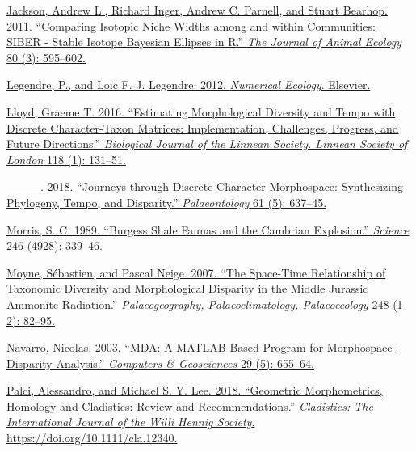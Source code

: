 \href{http://paperpile.com/b/sTGYvp/PwyQ}{Jackson, Andrew L., Richard
Inger, Andrew C. Parnell, and Stuart Bearhop. 2011. ``Comparing Isotopic
Niche Widths among and within Communities: SIBER - Stable Isotope
Bayesian Ellipses in R.''
}\href{http://paperpile.com/b/sTGYvp/PwyQ}{\emph{The Journal of Animal
Ecology}}\href{http://paperpile.com/b/sTGYvp/PwyQ}{ 80 (3): 595--602.}

\href{http://paperpile.com/b/sTGYvp/oFiP}{Legendre, P., and Loic F. J.
Legendre. 2012.
}\href{http://paperpile.com/b/sTGYvp/oFiP}{\emph{Numerical
Ecology}}\href{http://paperpile.com/b/sTGYvp/oFiP}{. Elsevier.}

\href{http://paperpile.com/b/sTGYvp/bCsU}{Lloyd, Graeme T. 2016.
``Estimating Morphological Diversity and Tempo with Discrete
Character-Taxon Matrices: Implementation, Challenges, Progress, and
Future Directions.''
}\href{http://paperpile.com/b/sTGYvp/bCsU}{\emph{Biological Journal of
the Linnean Society. Linnean Society of
London}}\href{http://paperpile.com/b/sTGYvp/bCsU}{ 118 (1): 131--51.}

\href{http://paperpile.com/b/sTGYvp/53SJ}{---------. 2018. ``Journeys
through Discrete-Character Morphospace: Synthesizing Phylogeny, Tempo,
and Disparity.''
}\href{http://paperpile.com/b/sTGYvp/53SJ}{\emph{Palaeontology}}\href{http://paperpile.com/b/sTGYvp/53SJ}{
61 (5): 637--45.}

\href{http://paperpile.com/b/sTGYvp/TtGs}{Morris, S. C. 1989. ``Burgess
Shale Faunas and the Cambrian Explosion.''
}\href{http://paperpile.com/b/sTGYvp/TtGs}{\emph{Science}}\href{http://paperpile.com/b/sTGYvp/TtGs}{
246 (4928): 339--46.}

\href{http://paperpile.com/b/sTGYvp/aVVj}{Moyne, Sébastien, and Pascal
Neige. 2007. ``The Space-Time Relationship of Taxonomic Diversity and
Morphological Disparity in the Middle Jurassic Ammonite Radiation.''
}\href{http://paperpile.com/b/sTGYvp/aVVj}{\emph{Palaeogeography,
Palaeoclimatology,
Palaeoecology}}\href{http://paperpile.com/b/sTGYvp/aVVj}{ 248 (1-2):
82--95.}

\href{http://paperpile.com/b/sTGYvp/EmTR}{Navarro, Nicolas. 2003. ``MDA:
A MATLAB-Based Program for Morphospace-Disparity Analysis.''
}\href{http://paperpile.com/b/sTGYvp/EmTR}{\emph{Computers \&
Geosciences}}\href{http://paperpile.com/b/sTGYvp/EmTR}{ 29 (5):
655--64.}

\href{http://paperpile.com/b/sTGYvp/yO2t}{Palci, Alessandro, and Michael
S. Y. Lee. 2018. ``Geometric Morphometrics, Homology and Cladistics:
Review and Recommendations.''
}\href{http://paperpile.com/b/sTGYvp/yO2t}{\emph{Cladistics: The
International Journal of the Willi Hennig
Society}}\href{http://paperpile.com/b/sTGYvp/yO2t}{.
https://doi.org/}\href{http://dx.doi.org/10.1111/cla.12340}{10.1111/cla.12340}\href{http://paperpile.com/b/sTGYvp/yO2t}{.}

